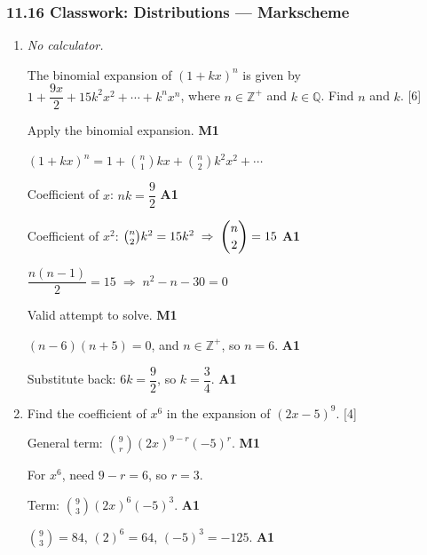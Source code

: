 \documentclass[12pt, twoside]{article}
\begin{document}
\subsubsection*{11.16 Classwork: Distributions --- Markscheme}

\begin{enumerate}[itemsep=0.3cm]

\item[1.] [Maximum mark: 6] \quad \emph{No calculator.}

The binomial expansion of $(1 + kx)^{n}$ is given by
$1 + \dfrac{9x}{2} + 15k^{2}x^{2} + \cdots + k^{n}x^{n}$, where
$n \in \mathbb{Z}^{+}$ and $k \in \mathbb{Q}$. Find $n$ and $k$. \hfill [6]

\medskip

Apply the binomial expansion. \hfill \textbf{M1}

$(1 + kx)^{n} = 1 + \binom{n}{1}kx + \binom{n}{2}k^{2}x^{2} + \cdots$

Coefficient of $x$:\; $nk = \dfrac{9}{2}$ \hfill \textbf{A1}

Coefficient of $x^{2}$:\; $\binom{n}{2}k^{2} = 15k^{2} \;\Rightarrow\; \dbinom{n}{2} = 15$ \hfill \textbf{A1}

\medskip

$\dfrac{n(n-1)}{2} = 15 \;\Rightarrow\; n^{2} - n - 30 = 0$

Valid attempt to solve. \hfill \textbf{M1}

$(n - 6)(n + 5) = 0$, and $n \in \mathbb{Z}^{+}$, so $n = 6$. \hfill \textbf{A1}

Substitute back: $6k = \dfrac{9}{2}$, so $k = \dfrac{3}{4}$. \hfill \textbf{A1}

\medskip

\item[2.] [Maximum mark: 4]

Find the coefficient of $x^{6}$ in the expansion of $(2x - 5)^{9}$. \hfill [4]

\medskip

General term:\; $\binom{9}{r}(2x)^{9-r}(-5)^{r}$. \hfill \textbf{M1}

For $x^{6}$, need $9 - r = 6$, so $r = 3$.

Term:\; $\binom{9}{3}(2x)^{6}(-5)^{3}$. \hfill \textbf{A1}

\medskip

$\binom{9}{3} = 84$, \;\; $(2)^{6} = 64$, \;\; $(-5)^{3} = -125$. \hfill \textbf{A1}


\end{enumerate}
\end{document}
